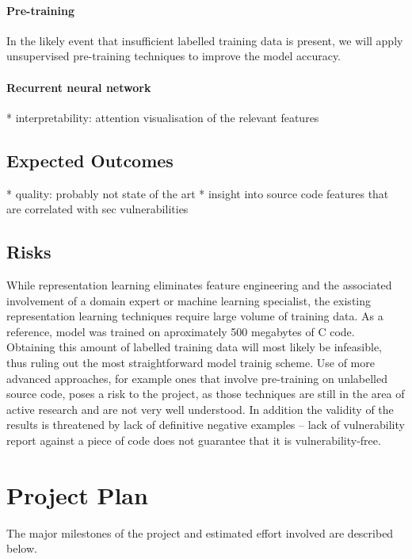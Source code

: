 \documentclass[twoside,a4paper]{scrartcl}
\begin{document}
\paragraph{Pre-training} In the likely event that insufficient labelled training data is
present, we will apply unsupervised pre-training techniques to improve the model accuracy.

\paragraph{Recurrent neural network}

* interpretability: attention visualisation of the relevant features

\subsection{Expected Outcomes}

* quality: probably not state of the art
* insight into source code features that are correlated with sec vulnerabilities

\subsection{Risks}

While representation learning eliminates feature engineering and the associated
involvement of a domain expert or machine learning specialist, the existing 
representation learning techniques
require large volume of training data. As a reference, \cite{karpathy2015unreasonable} 
model was 
trained on aproximately 500 megabytes of C code. Obtaining this amount of labelled 
training data will most likely be infeasible, thus ruling out the most straightforward
model trainig scheme. Use of more advanced approaches, for example ones that involve
pre-training on unlabelled source code, poses a risk to the project, as those techniques
are still in the area of active research and are not very well understood. In addition
the validity of the results is threatened by lack of definitive negative examples --
lack of vulnerability report against a piece of code does not guarantee that it is
vulnerability-free.

\section{Project Plan}

The major milestones of the project and estimated effort involved are described below.
\end{document}
